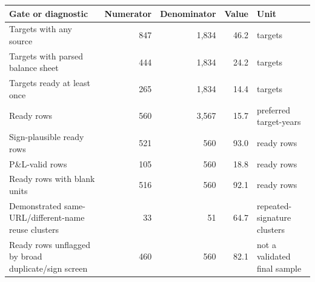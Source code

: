 \begin{tabular}{lrrrl}
\toprule
Gate or diagnostic & Numerator & Denominator & Value & Unit \\
\midrule
Targets with any source & 847 & 1,834 & 46.2 & targets \\
Targets with parsed balance sheet & 444 & 1,834 & 24.2 & targets \\
Targets ready at least once & 265 & 1,834 & 14.4 & targets \\
Ready rows & 560 & 3,567 & 15.7 & preferred target-years \\
Sign-plausible ready rows & 521 & 560 & 93.0 & ready rows \\
P\&L-valid rows & 105 & 560 & 18.8 & ready rows \\
Ready rows with blank units & 516 & 560 & 92.1 & ready rows \\
Demonstrated same-URL/different-name reuse clusters & 33 & 51 & 64.7 & repeated-signature clusters \\
Ready rows unflagged by broad duplicate/sign screen & 460 & 560 & 82.1 & not a validated final sample \\
\bottomrule
\end{tabular}
